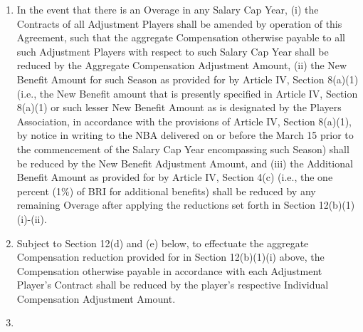 \documentclass[
]{book}
\providecommand{\tightlist}{%
  \setlength{\itemsep}{0pt}\setlength{\parskip}{0pt}}
\begin{document}
\begin{enumerate}
  \begin{enumerate}
  \def\labelenumii{(\arabic{enumii})}
  \tightlist
  \item
    In the event that there is an Overage in any Salary Cap Year, (i) the Contracts of all Adjustment Players shall be amended by operation of this Agreement, such that the aggregate Compensation otherwise payable to all such Adjustment Players with respect to such Salary Cap Year shall be reduced by the Aggregate Compensation Adjustment Amount, (ii) the New Benefit Amount for such Season as provided for by Article IV, Section 8(a)(1) (i.e., the New Benefit amount that is presently specified in Article IV, Section 8(a)(1) or such lesser New Benefit Amount as is designated by the Players Association, in accordance with the provisions of Article IV, Section 8(a)(1), by notice in writing to the NBA delivered on or before the March 15 prior to the commencement of the Salary Cap Year encompassing such Season) shall be reduced by the New Benefit Adjustment Amount, and (iii) the Additional Benefit Amount as provided for by Article IV, Section 4(c) (i.e., the one percent (1\%) of BRI for additional benefits) shall be reduced by any remaining Overage after applying the reductions set forth in Section 12(b)(1)(i)-(ii).
  \item
    Subject to Section 12(d) and (e) below, to effectuate the aggregate Compensation reduction provided for in Section 12(b)(1)(i) above, the Compensation otherwise payable in accordance with each Adjustment Player's Contract shall be reduced by the player's respective Individual Compensation Adjustment Amount.
  \item

\end{enumerate}
\end{enumerate}
\end{document}
